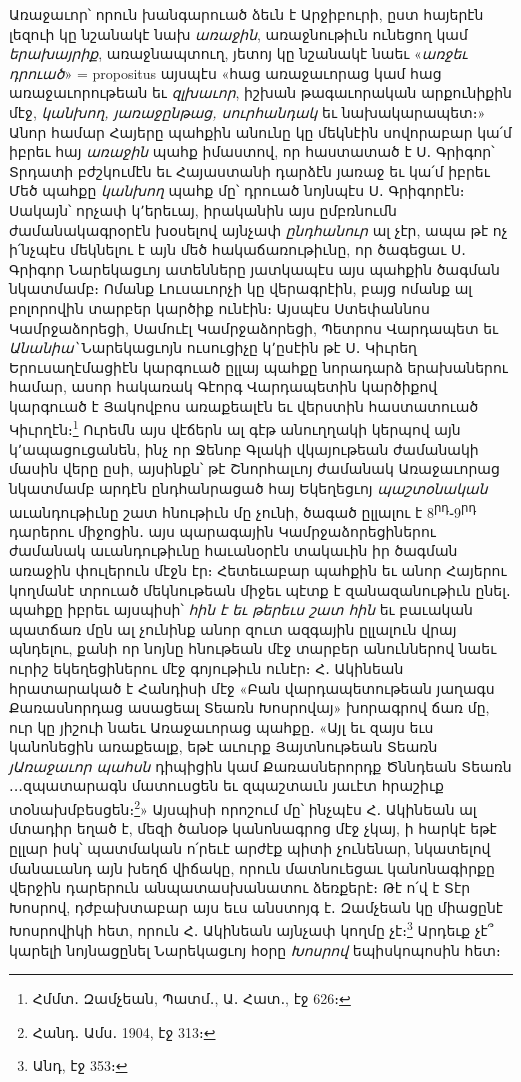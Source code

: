 \documentclass{article}
\begin{document}
{Առաջաւոր՝ որուն խանգարուած ձեւն է Արջիբուրի, ըստ հայերէն լեզուի կը նշանակէ նախ \emph{առաջին}, առաջնութիւն ունեցող կամ \emph{երախայրիք}, առաջնապտուղ, յետոյ կը նշանակէ նաեւ «\emph{առջեւ դրուած}» = propositus այսպէս «հաց առաջաւորաց կամ հաց առաջաւորութեան եւ \emph{զլխաւոր}, իշխան թագաւորական արքունիքին մէջ, \emph{կանխող, յառաջընթաց, սուրհանդակ} եւ նախակարապետ։» Անոր համար Հայերը պահքին անունը կը մեկնէին սովորաբար կա՛մ իբրեւ հայ \emph{առաջին} պահք իմաստով, որ հաստատած է Ս․ Գրիգոր՝ Տրդատի բժշկումէն եւ Հայաստանի դարձէն յառաջ եւ կա՛մ իբրեւ Մեծ պահքը \emph{կանխող} պահք մը՝ դրուած նոյնպէս Ս․ Գրիգորէն։ Սակայն՝ որչափ կ՚երեւայ, իրականին այս ըմբռնումն ժամանակագրօրէն խօսելով այնչափ \emph{ընդհանուր} ալ չէր, ապա թէ ոչ ի՛նչպէս մեկնելու է այն մեծ հակաճառութիւնը, որ ծագեցաւ Ս․ Գրիգոր Նարեկացւոյ ատենները յատկապէս այս պահքին ծագման նկատմամբ։ Ոմանք Լուսաւորչի կը վերագրէին, բայց ոմանք ալ բոլորովին տարբեր կարծիք ունէին։ Այսպէս Ստեփաննոս Կամրջաձորեցի, Սամուէլ Կամրջաձորեցի, Պետրոս Վարդապետ եւ \emph{Անանիա՝} Նարեկացւոյն ուսուցիչը կ՚ըսէին թէ Ս․ Կիւրեղ Երուսաղէմացիէն կարգուած ըլլայ պահքը նորադարձ երախաներու համար, ասոր հակառակ Գէորգ Վարդապետին կարծիքով կարգուած է Յակովբոս առաքեալէն եւ վերստին հաստատուած Կիւրղէն։\footnote{Հմմտ․ Զամչեան, Պատմ․, Ա․ Հատ․, էջ 626։} Ուրեմն այս վէճերն ալ գէթ անուղղակի կերպով այն կ՚ապացուցանեն, ինչ որ Ջենոբ Գլակի վկայութեան ժամանակի մասին վերը ըսի, այսինքն՝ թէ Շնորհալւոյ ժամանակ Առաջաւորաց նկատմամբ արդէն ընդհանրացած հայ Եկեղեցւոյ \emph{պաշտօնական} աւանդութիւնը շատ հնութիւն մը չունի, ծագած ըլլալու է 8\textsuperscript{րդ}֊9\textsuperscript{րդ} դարերու միջոցին․ այս պարագային Կամրջաձորեցիներու ժամանակ աւանդութիւնը հաւանօրէն տակաւին իր ծագման առաջին փուլերուն մէջն էր։ Հետեւաբար պահքին եւ անոր Հայերու կողմանէ տրուած մեկնութեան միջեւ պէտք է զանազանութիւն ընել․ պահքը իբրեւ այսպիսի՝ \emph{հին է եւ թերեւս շատ հին} եւ բաւական պատճառ մըն ալ չունինք անոր զուտ ազգային ըլլալուն վրայ պնդելու, քանի որ նոյնը հնութեան մէջ տարբեր անուններով նաեւ ուրիշ եկեղեցիներու մէջ գոյութիւն ունէր։ Հ․ Ակինեան հրատարակած է Հանդիսի մէջ «Բան վարդապետութեան յաղագս Քառասնորդաց ասացեալ Տեառն Խոսրովայ» խորագրով ճառ մը, ուր կը յիշուի նաեւ Առաջաւորաց պահքը․ «Այլ եւ զայս եւս կանոնեցին առաքեալք, եթէ աւուրք Յայտնութեան Տեառն \emph{յԱռաջաւոր պահսն} դիպիցին կամ Քառասներորդք Ծննդեան Տեառն ․․․զպատարագն մատուսցեն եւ զպաշտաւն յաւէտ հրաշիւք տօնախմբեսցեն։\footnote{Հանդ․ Ամս․ 1904, էջ 313։}» Այսպիսի որոշում մը՝ ինչպէս Հ․ Ակինեան ալ մտադիր եղած է, մեզի ծանօթ կանոնագրոց մէջ չկայ, ի հարկէ եթէ ըլլար իսկ՝ պատմական ո՛րեւէ արժէք պիտի չունենար, նկատելով մանաւանդ այն խեղճ վիճակը, որուն մատնուեցաւ կանոնագիրքը վերջին դարերուն անպատասխանատու ձեռքերէ։ Թէ ո՛վ է Տէր Խոսրով, դժբախտաբար այս եւս անստոյգ է․ Զամչեան կը միացընէ Խոսրովիկի հետ, որուն Հ․ Ակինեան այնչափ կողմը չէ։\footnote{Անդ, էջ 353։} Արդեւք չէ՞ կարելի նոյնացընել Նարեկացւոյ հօրը \emph{Խոսրով} եպիսկոպոսին հետ։

}
\end{document}
